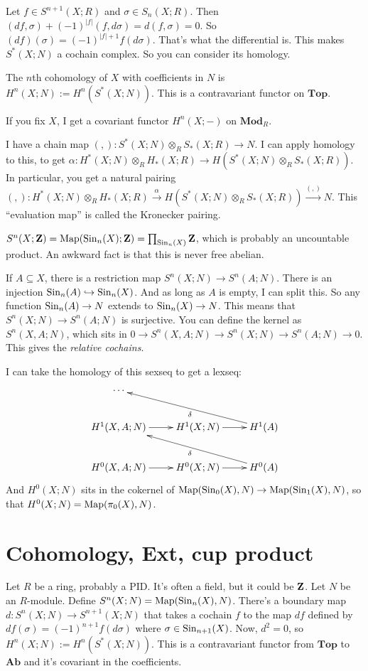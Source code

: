 Let $f\in S^{n+1}(X;R)$ and $\sigma\in S_n(X;R)$. Then $(df,\sigma)+(-1)^{|f|}(f,d\sigma)=d(f,\sigma)=0$. So $(df)(\sigma)=(-1)^{|f|+1}f(d\sigma)$. That's what the differential is. This makes $S^\ast(X;N)$ a cochain complex. So you can consider its homology.
\begin{definition}
The $n$th cohomology of $X$ with coefficients in $N$ is $ H^n(X;N):= H^n(S^\ast(X;N))$. This is a contravariant functor on $\mathbf{Top}$.
\end{definition}
If you fix $X$, I get a covariant functor $ H^n(X;-)$ on $\mathbf{Mod}_R$.
\begin{construction}
I have a chain map $(,):S^\ast(X;N)\otimes_R S_\ast(X;R)\to N$. I can apply homology to this, to get $\alpha: H^\ast(X;N)\otimes_R H_\ast(X;R)\to H(S^\ast(X;N)\otimes_R S_\ast(X;R))$. In particular, you get a natural pairing $(,): H^\ast(X;N)\otimes_R H_\ast(X;R)\xrightarrow{\alpha} H(S^\ast(X;N)\otimes_R S_\ast(X;R))\xrightarrow{(,)}N$. This ``evaluation map'' is called the Kronecker pairing.
\end{construction}
\begin{warning}
$S^n(X;\mathbf Z)=\operatorname{Map}(\mathrm{Sin}_n(X);\mathbf Z)=\prod_{\mathrm{Sin}_n(X)}\mathbf Z$, which is probably an uncountable product. An awkward fact is that this is never free abelian.
\end{warning}
\begin{construction}
If $A\subseteq X$, there is a restriction map $S^n(X;N)\to S^n(A;N)$. There is an injection $\mathrm{Sin}_n(A)\hookrightarrow \mathrm{Sin}_n(X)$. And as long as $A$ is empty, I can split this. So any function $\mathrm{Sin}_n(A)\to N$ extends to $\mathrm{Sin}_n(X)\to N$. This means that $S^n(X;N)\to S^n(A;N)$ is surjective. You can define the kernel as $S^n(X,A;N)$, which sits in $0\to S^n(X,A;N)\to S^n(X;N)\to S^n(A;N)\to 0$. This gives the \emph{relative cochains}.
\end{construction}
I can take the homology of this sexseq to get a lexseq:
\begin{equation*}
\xymatrix{
	\cdots & & \\
	 H^1(X,A;N)\ar[r] & H^1(X;N)\ar[r] & H^1(A)\ar[ull]^{\delta}\\
	 H^0(X,A;N)\ar[r] & H^0(X;N)\ar[r] & H^0(A)\ar[ull]^{\delta}
}
\end{equation*}
And $ H^0(X;N)$ sits in the cokernel of $\operatorname{Map}(\mathrm{Sin}_0(X),N)\to \operatorname{Map}(\mathrm{Sin}_1(X),N)$, so that $ H^0(X;N)=\operatorname{Map}(\pi_0(X),N)$.
\section{Cohomology, Ext, cup product}
Let $R$ be a ring, probably a PID. It's often a field, but it could be $\mathbf Z$. Let $N$ be an $R$-module. Define $S^n(X;N)=\operatorname{Map}(\mathrm{Sin}_n(X),N)$. There's a boundary map $d:S^n(X;N)\to S^{n+1}(X;N)$ that takes a cochain $f$ to the map $df$ defined by $df(\sigma)=(-1)^{n+1}f(d\sigma)$ where $\sigma\in \mathrm{Sin}_{n+1}(X)$. Now, $d^2=0$, so $ H^n(X;N):= H^n(S^\ast(X;N))$. This is a contravariant functor from $\mathbf{Top}$ to $\mathbf{Ab}$ and it's covariant in the coefficients. 

